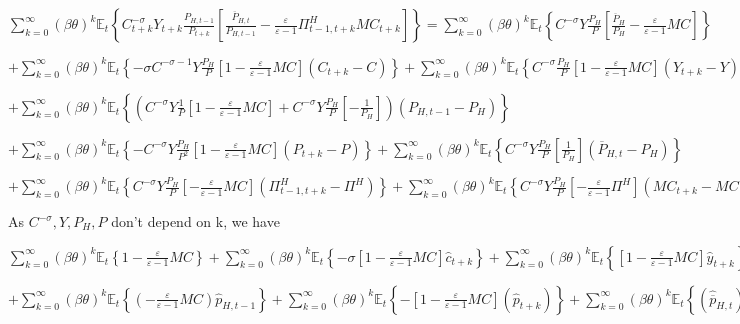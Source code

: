 \documentclass[
]{article}
\begin{document}
\(\displaystyle \sum_{k=0}^\infty (\beta \theta)^k\mathbb{E}_t \left\{ C_{t+k}^{-\sigma} Y_{t+k } \frac{P_{H,t-1}}{P_{t+k}} \left[ \frac{\overline{P}_{H,t}}{P_{H,t-1}}-\frac{\varepsilon}{\varepsilon-1}\Pi_{t-1,t+k}^H MC_{t+k}\right] \right\} = \sum_{k=0}^\infty (\beta \theta)^k\mathbb{E}_t \left\{ C^{-\sigma} Y \frac{P_{H}}{P} \left[ \frac{\overline{P}_{H}}{P_{H}}-\frac{\varepsilon}{\varepsilon-1} MC \right] \right\}\)

\(\displaystyle + \sum_{k=0}^\infty (\beta \theta)^k\mathbb{E}_t \left\{ -\sigma C^{-\sigma-1} Y \frac{P_{H}}{P} \left[ 1-\frac{\varepsilon}{\varepsilon-1} MC \right](C_{t+k}-C) \right\} + \sum_{k=0}^\infty (\beta \theta)^k\mathbb{E}_t \left\{ C^{-\sigma} \frac{P_{H}}{P} \left[ 1-\frac{\varepsilon}{\varepsilon-1} MC \right](Y_{t+k}-Y) \right\}\)

\(\displaystyle + \sum_{k=0}^\infty (\beta \theta)^k\mathbb{E}_t \left\{ \left( C^{-\sigma} Y \frac{1}{P} \left[ 1-\frac{\varepsilon}{\varepsilon-1} MC \right] + C^{-\sigma}Y \frac{P_H}{P} \left[ -\frac{1}{P_H} \right] \right)(P_{H,t-1}-P_H) \right\}\)

\(\displaystyle + \sum_{k=0}^\infty (\beta \theta)^k\mathbb{E}_t \left\{ -C^{-\sigma} Y \frac{P_{H}}{P^2} \left[ 1-\frac{\varepsilon}{\varepsilon-1} MC \right](P_{t+k}-P) \right\} + \sum_{k=0}^\infty (\beta \theta)^k\mathbb{E}_t \left\{ C^{-\sigma} Y \frac{P_{H}}{P} \left[ \frac{1}{P_H} \right](\overline{P}_{H,t}-P_H) \right\}\)

\(\displaystyle + \sum_{k=0}^\infty (\beta \theta)^k\mathbb{E}_t \left\{ C^{-\sigma} Y \frac{P_{H}}{P} \left[ -\frac{\varepsilon}{\varepsilon-1} MC \right](\Pi_{t-1,t+k}^H-\Pi^H) \right\} + \sum_{k=0}^\infty (\beta \theta)^k\mathbb{E}_t \left\{ C^{-\sigma} Y \frac{P_{H}}{P} \left[ -\frac{\varepsilon}{\varepsilon-1} \Pi^H \right](MC_{t+k}-MC) \right\}=0\)

As \(C^{-\sigma}, Y, P_H, P\) don't depend on k, we have

\(\displaystyle \sum_{k=0}^\infty (\beta \theta)^k\mathbb{E}_t \left\{ 1-\frac{\varepsilon}{\varepsilon-1} MC \right\} + \sum_{k=0}^\infty (\beta \theta)^k\mathbb{E}_t \left\{ -\sigma \left[ 1-\frac{\varepsilon}{\varepsilon-1} MC \right]\hat{c}_{t+k} \right\} + \sum_{k=0}^\infty (\beta \theta)^k\mathbb{E}_t \left\{ \left[ 1-\frac{\varepsilon}{\varepsilon-1} MC \right]\hat{y}_{t+k} \right\}\)

\(\displaystyle + \sum_{k=0}^\infty (\beta \theta)^k\mathbb{E}_t \left\{ \left(-\frac{\varepsilon}{\varepsilon-1} MC \right)\hat{p}_{H,t-1} \right\} + \sum_{k=0}^\infty (\beta \theta)^k\mathbb{E}_t \left\{ - \left[ 1-\frac{\varepsilon}{\varepsilon-1} MC \right](\hat{p}_{t+k}) \right\} + \sum_{k=0}^\infty (\beta \theta)^k\mathbb{E}_t \left\{ (\hat{\overline{p}}_{H,t}) \right\}\)
\end{document}
